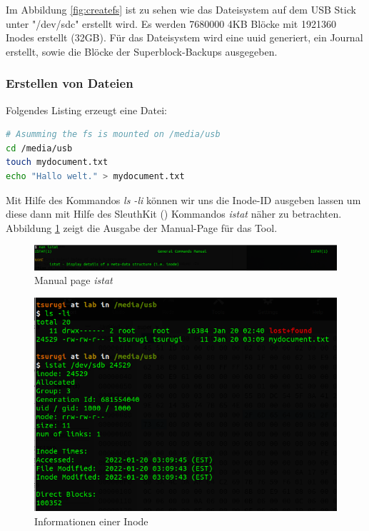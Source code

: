 Im Abbildung \ref{fig:createfs} ist zu sehen wie das Dateisystem auf dem USB Stick unter "/dev/sdc" erstellt wird. Es werden 7680000 4KB Blöcke mit 1921360 Inodes erstellt (32GB). Für das Dateisystem wird eine \ac{uuid} generiert, ein Journal erstellt, sowie die Blöcke der Superblock-Backups ausgegeben.


\subsubsection{Erstellen von Dateien}

Folgendes Listing erzeugt eine Datei:

\begin{lstlisting}[language=bash]
# Asumming the fs is mounted on /media/usb
cd /media/usb
touch mydocument.txt
echo "Hallo welt." > mydocument.txt
\end{lstlisting} 

Mit Hilfe des Kommandos \textit{ls -li} können wir uns die Inode-ID ausgeben lassen um diese dann mit Hilfe des SleuthKit (\cite{Sleuthkit.07.01.2022}) Kommandos \textit{istat} näher zu betrachten. Abbildung \ref{fig:istatman} zeigt die Ausgabe der Manual-Page für das Tool.

\begin{figure}[H]
	\centering
	\includegraphics[width=12cm,keepaspectratio=true]{pictures/istat-man.png}
	\caption{
		Manual page \textit{istat}
	}
	\label{fig:istatman}
\end{figure}


\begin{figure}[H]
	\centering
	\includegraphics[width=12cm,keepaspectratio=true]{pictures/inode-stats.png}
	\caption{
		Informationen einer Inode
	}
	\label{fig:inodestats}
\end{figure}

